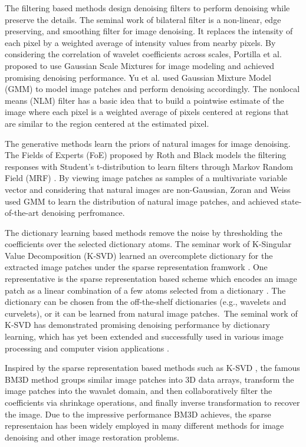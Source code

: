 The filtering based methods design denoising filters to perform denoising while preserve the details. The seminal work of bilateral filter \cite{Tomasi1998} is a non-linear, edge preserving, and smoothing filter for image denoising. It replaces the intensity of each pixel by a weighted average of intensity values from nearby pixels. By considering the correlation of wavelet coefficients across scales, Portilla et al. \cite{blsgsm} proposed to use Gaussian Scale Mixtures for image modeling and achieved promising denoising performance. Yu et al. \cite{ple} used Gaussian Mixture Model (GMM) to model image patches and perform denoising accordingly. The nonlocal means (NLM) filter \cite{nlm} has a basic idea that to build a pointwise estimate of the image where each pixel is a weighted average of pixels centered at regions that are similar to the region centered at the estimated pixel.

The generative methods learn the priors of natural images for image denoising. The Fields of Experts (FoE) \cite{foe} proposed by Roth and Black models the filtering responses with Student's t-distribution to learn filters through Markov Random Field (MRF) \cite{Bishop}. By viewing image patches as samples of a multivariate variable vector and considering that natural images are non-Gaussian, Zoran and Weiss \cite{epll,gmmnips} used GMM to learn the distribution of natural image patches, and achieved state-of-the-art denoising perfromance.

The dictionary learning based methods remove the noise by thresholding the coefficients over the selected dictionary atoms. The seminar work of K-Singular Value Decomposition (K-SVD) \cite{ksvd} learned an overcomplete dictionary for the extracted image patches under the sparse representation framwork \cite{olshausen1997sparse,olshausen1996emergence}. One representative is the sparse representation based scheme which encodes an image patch as a linear combination of a few atoms selected from a dictionary \cite{olshausen1996emergence,olshausen1997sparse,ksvd}. The dictionary can be chosen from the off-the-shelf dictionaries (e.g., wavelets and curvelets), or it can be learned from natural image patches.\ The seminal work of K-SVD \cite{ksvdtsp,ksvd} has demonstrated promising denoising performance by dictionary learning, which has yet been extended and successfully used in various image processing and computer vision applications \cite{srcolor,srcvpr,lcksvd,onlinedl}. 

Inspired by the sparse representation based methods such as K-SVD \cite{ksvd}, the famous BM3D \cite{bm3d} method groups similar image patches into 3D data arrays, transform the image patches into the wavalet domain, and then collaboratively filter the coefficients via shrinkage operations, and finally inverse transformation to recover the image. Due to the impressive performance BM3D achieves, the sparse representaion has been widely employed in many different methods \cite{lssc,ncsr} for image denoising and other image restoration problems. 

